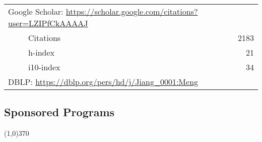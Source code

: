 \documentclass[10pt]{article}
\begin{document}
\begin{table}[h!]
\begin{tabular*}{12.7cm}{p{11.65cm}r}
\multicolumn{2}{l}{Google Scholar: \url{https://scholar.google.com/citations?user=LZIPfCkAAAAJ}} \\
~~~~~Citations&2183 \\
~~~~~h-index&21 \\
~~~~~i10-index&34 \\
\multicolumn{2}{l}{DBLP: \url{https://dblp.org/pers/hd/j/Jiang\_0001:Meng}} \\
\end{tabular*}
\end{table}

\subsection{\sc Sponsored Programs}
\vspace{-0.4cm} \line(1,0){370} \vspace{-0.1cm}
\end{document}

